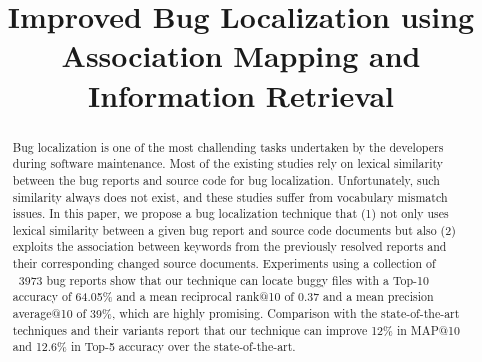 \documentclass[conference]{IEEEtran}
\begin{document}
\title{Improved Bug Localization using Association Mapping and Information Retrieval\\
}



\maketitle

\begin{abstract}
Bug localization is one of the most challending tasks undertaken by the developers during software maintenance.
Most of the existing studies rely on lexical similarity between the bug reports and source code for bug localization.
Unfortunately, such similarity always does not exist, and these studies suffer from vocabulary mismatch issues.
In this paper, we propose a bug localization technique that (1) not only uses lexical similarity between a given bug report and source code documents  
but also (2) exploits the association between keywords from the previously resolved reports and their corresponding changed source documents.
Experiments using a collection of ~3973 bug reports show that our technique can locate buggy files with a Top-10 accuracy of 64.05\% and a mean reciprocal rank@10 of 0.37 and a mean precision average@10 of 39\%, which are highly promising. 
Comparison with the state-of-the-art techniques
and their variants report that our technique can improve 12\% in
MAP@10 and 12.6\% in Top-5 accuracy over the state-of-the-art.
\end{abstract}
\end{document}
